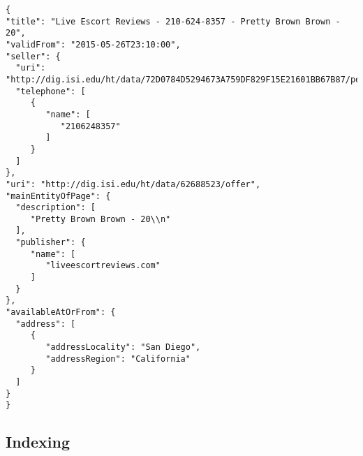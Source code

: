\begin{verbatim}
{
"title": "Live Escort Reviews - 210-624-8357 - Pretty Brown Brown - 20",
"validFrom": "2015-05-26T23:10:00",
"seller": {
  "uri": "http://dig.isi.edu/ht/data/72D0784D5294673A759DF829F15E21601BB67B87/personororganization",
  "telephone": [
     {
        "name": [
           "2106248357"
        ]
     }
  ]
},
"uri": "http://dig.isi.edu/ht/data/62688523/offer",
"mainEntityOfPage": {
  "description": [
     "Pretty Brown Brown - 20\\n"
  ],
  "publisher": {
     "name": [
        "liveescortreviews.com"
     ]
  }
},
"availableAtOrFrom": {
  "address": [
     {
        "addressLocality": "San Diego",
        "addressRegion": "California"
     }
  ]
}
}
\end{verbatim}

\subsection{Indexing}
